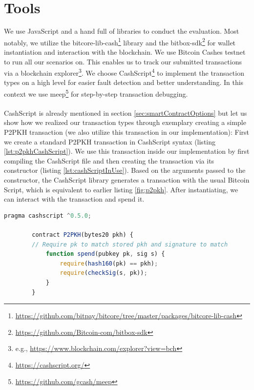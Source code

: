 \documentclass{cacthesis}
\begin{document}
	    \section{Tools}
        We use JavaScript and a hand full of libraries to conduct the evaluation. Most notably, we utilize the bitcore-lib-cash\footnote{\url{https://github.com/bitpay/bitcore/tree/master/packages/bitcore-lib-cash}} library and the bitbox-sdk\footnote{\url{https://github.com/Bitcoin-com/bitbox-sdk}} for wallet instantiation and interaction with the blockchain. We use Bitcoin Cashes testnet to run all our scenarios on. This enables us to track our submitted transactions via a blockchain explorer\footnote{e.g., \url{https://www.blockchain.com/explorer?view=bch}}. We choose CashScript\footnote{\url{https://cashscript.org/}} to implement the transaction types on a high level for easier fault detection and better understanding. In this context we use meep\footnote{\url{https://github.com/gcash/meep}} for step-by-step transaction debugging. \\\\  
        CashScript is already mentioned in section \ref{sec:smartContractOptions} but let us show how we realized our transaction types through exemplary creating a simple P2PKH transaction (we also utilize this transaction in our implementation): First we create a standard P2PKH transaction in CashScript syntax (listing \ref{lst:p2pkhCashScript}). We use this transaction inside our implementation by first compiling the CashScript file and then creating the transaction via its constructor (listing \ref{lst:cashScriptInUse}). Based on the arguments passed to the constructor, the CashScript library generates a transaction with the usual Bitcoin Script, which is equivalent to earlier listing \ref{fig:p2pkh}. After instantiating, we can interact with the transaction and spend it. \\
	    
        \begin{lstlisting}[language=JavaScript, basicstyle=\footnotesize, caption= p2pkh.cash - Bitcoin \textit{P2PKH} in high-level CashScript, captionpos=b, backgroundcolor=\color{backcolour}, label=lst:p2pkhCashScript]
        pragma cashscript ^0.5.0;

        contract P2PKH(bytes20 pkh) {
        // Require pk to match stored pkh and signature to match
            function spend(pubkey pk, sig s) {
                require(hash160(pk) == pkh);
                require(checkSig(s, pk));
            }
        }
        \end{lstlisting} \newpage
    
\end{document}
